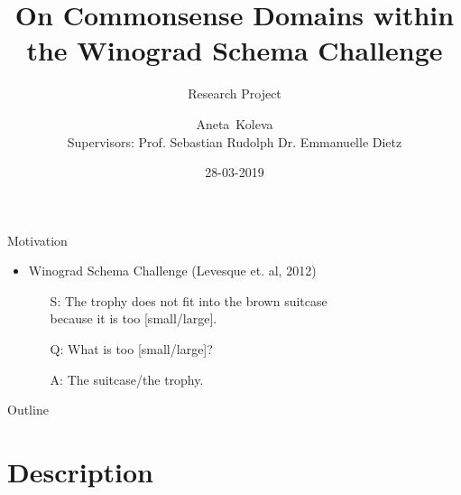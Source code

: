 \documentclass[smaller,dvipsnames,ratio=169]{beamer}
\title{On Commonsense Domains within\\ the Winograd Schema Challenge
}
\subtitle{Research Project}
\author[author1]{Aneta~Koleva\\[10mm]{\small Supervisors: Prof. Sebastian Rudolph \hspace{10mm} Dr. Emmanuelle Dietz}}
\institute{Dresden University of Technology\\[2mm] }
\date{28-03-2019}
\begin{document}
  \maketitle


  \begin{frame}{Motivation}
  	
	\begin{itemize} 	
		\item Winograd Schema Challenge (Levesque et. al, 2012)
			\begin{itemize}
				\normalsize
				\item[S:] The trophy does not fit into the brown suitcase\\ because \alert{it} is too \alert{[small/large]}.
				\item[Q:] What is too [small/large]?
				\item[A:] The suitcase/the trophy.
			\end{itemize}	
		
	\end{itemize}
		\centering
					
\end{frame}

\begin{frame}{Outline}
	\tableofcontents
\end{frame}

\section{Description}
\end{document}
